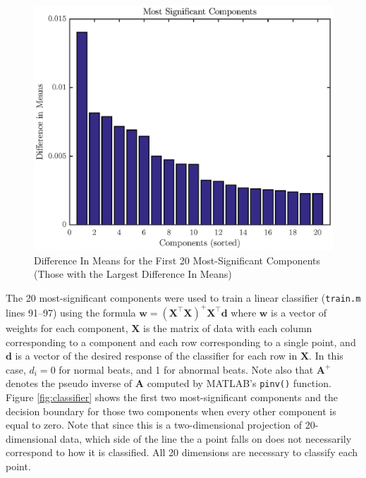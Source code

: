 \documentclass[titlepage,12pt,letter]{article}
\begin{document}
\begin{figure}[hbtp]
    \centering
    \includegraphics[height=0.42\textheight]{../figures/train_04}
    \caption{Difference In Means for the First 20 Most-Significant Components
    (Those with the Largest Difference In Means)}
    \label{fig:sig}
\end{figure}

The 20 most-significant components were used to train a linear classifier
(\verb`train.m` lines 91--97) using the formula $\mathbf{w} = (\mathbf{X}^\top
\mathbf{X})^+ \mathbf{X}^\top \mathbf{d}$ where $\mathbf{w}$ is a vector of
weights for each component, $\mathbf{X}$ is the matrix of data with each column
corresponding to a component and each row corresponding to a single point, and
$\mathbf{d}$ is a vector of the desired response of the classifier for each row
in $\mathbf{X}$.  In this case, $d_i = 0$ for normal beats, and 1 for abnormal
beats.  Note also that $\mathbf{A}^+$ denotes the pseudo inverse of $\mathbf{A}$
computed by MATLAB's \verb`pinv()` function.  Figure \ref{fig:classifier} shows
the first two most-significant components and the decision boundary for those
two components when every other component is equal to zero.  Note that since
this is a two-dimensional projection of 20-dimensional data, which side of the
line the a point falls on does not necessarily correspond to how it is
classified.  All 20 dimensions are necessary to classify each point.  
\end{document}

